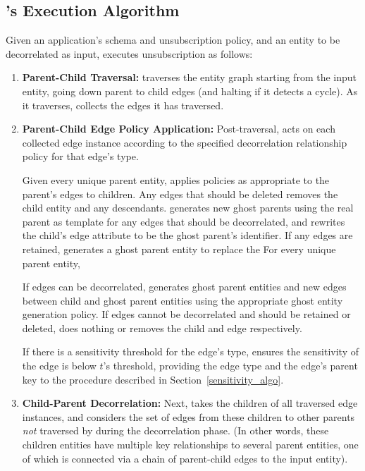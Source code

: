 \subsection{\sys's Execution Algorithm}
Given an application's schema and unsubscription policy, and an entity to be decorrelated as input,
\sys executes unsubscription as follows:
\begin{enumerate}
    \item \textbf{Parent-Child Traversal:} \sys traverses the entity graph starting from the input entity,
        going down parent to child edges (and halting if it detects a cycle).  As it traverses,
        \sys collects the edges it has traversed. 
    
    \item \textbf{Parent-Child Edge Policy Application:} 
        Post-traversal, \sys acts on each collected edge instance according to the specified
        decorrelation relationship policy for that edge's type.

        Given every unique parent entity, \sys applies policies as appropriate to the parent's edges
        to children. Any edges that should be deleted removes the child entity and any descendants.
        \sys generates new ghost parents using the real parent as template for any edges that should
        be decorrelated, and rewrites the child's edge attribute to be the ghost parent's
        identifier. If any edges are retained, \sys generates a ghost parent entity to replace the 
        For every unique parent entity, \sys 

        If edges can be decorrelated, \sys generates ghost parent entities and new edges between
        child and ghost parent entities using the appropriate ghost entity generation policy. If
        edges cannot be decorrelated and should be retained or deleted, \sys does nothing or removes
        the child and edge respectively. 
    
        If there is a sensitivity threshold for the edge's type, \sys ensures the
        sensitivity of the edge is below $t$'s threshold, providing the edge type and the edge's
        parent key to the procedure described in Section~\ref{sensitivity_algo}. 

    \item \textbf{Child-Parent Decorrelation:} Next, \sys takes the children of all traversed edge
        instances, and considers the set of edges from these children to other parents
        \emph{not} traversed by \sys during the decorrelation phase. (In other words, these
        children entities have multiple key relationships to several parent entities, one of
        which is connected via a chain of parent-child edges to the input entity).


\end{enumerate}
